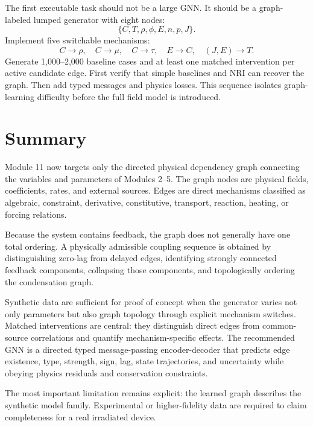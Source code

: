 \documentclass[11pt]{article}
\begin{document}
The first executable task should not be a large GNN. It should be a graph-labeled lumped generator with eight nodes:
\begin{equation}
\{C,T,\rho,\phi,E,n,p,J\}.
\end{equation}
Implement five switchable mechanisms:
\begin{equation}
C\rightarrow\rho,\quad C\rightarrow\mu,\quad C\rightarrow\tau,\quad E\rightarrow C,\quad (J,E)\rightarrow T.
\end{equation}
Generate 1,000--2,000 baseline cases and at least one matched intervention per active candidate edge. First verify that simple baselines and NRI can recover the graph. Then add typed messages and physics losses. This sequence isolates graph-learning difficulty before the full field model is introduced.

\section{Summary}

Module 11 now targets only the directed physical dependency graph connecting the variables and parameters of Modules 2--5. The graph nodes are physical fields, coefficients, rates, and external sources. Edges are direct mechanisms classified as algebraic, constraint, derivative, constitutive, transport, reaction, heating, or forcing relations.

Because the system contains feedback, the graph does not generally have one total ordering. A physically admissible coupling sequence is obtained by distinguishing zero-lag from delayed edges, identifying strongly connected feedback components, collapsing those components, and topologically ordering the condensation graph.

Synthetic data are sufficient for proof of concept when the generator varies not only parameters but also graph topology through explicit mechanism switches. Matched interventions are central: they distinguish direct edges from common-source correlations and quantify mechanism-specific effects. The recommended GNN is a directed typed message-passing encoder-decoder that predicts edge existence, type, strength, sign, lag, state trajectories, and uncertainty while obeying physics residuals and conservation constraints.

The most important limitation remains explicit: the learned graph describes the synthetic model family. Experimental or higher-fidelity data are required to claim completeness for a real irradiated device.
\end{document}
